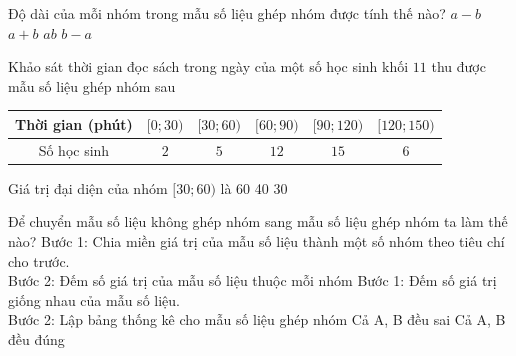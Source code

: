

\begin{ex}%
	Độ dài của mỗi nhóm trong mẫu số liệu ghép nhóm được tính  thế nào?
	\choice 
		 {$a-b$}
		 {$a+b$}
		{$ab$} 
		 {\True $b-a$}
	\loigiai{Độ dài của nhóm $[a;b)$ là  $b-a$.}
\end{ex}

\begin{ex}%
	Khảo sát thời gian đọc sách trong ngày của một số học sinh khối $11$  thu được mẫu số liệu ghép nhóm sau
	\begin{center}
		\begin{tabular}{|c|c|c|c|c|c|}
			 \hline
			Thời gian (phút) & $[0;30)$ & $[30;60)$ & $[60;90)$ & $[90;120)$ & $[120;150)$  \\
			\hline 
			Số học sinh & $2$ & $5$ & $12$ & $15$ & $6$ \\ 
			 \hline
		\end{tabular}
	\end{center}
	Giá  trị đại diện của nhóm $[30;60)$ là
	\choice 
		 {60}
		 {40}
		{}
		{30} 
	\loigiai{Giá trị đại diện của nhóm $[30;60)$ là $\dfrac{30+60}{2}=45$.} 
\end{ex}

\begin{ex}%
	Để chuyển mẫu số liệu không ghép nhóm sang mẫu số liệu ghép nhóm ta  làm thế nào?
	\choice 
		{\True Bước 1: Chia miền giá trị của mẫu số liệu thành một số nhóm theo tiêu  chí cho trước.
		\\ Bước 2: Đếm số giá trị của  mẫu số liệu thuộc mỗi nhóm}
		{Bước 1: Đếm số giá trị giống nhau của mẫu số liệu. \\ Bước 2: Lập bảng thống  kê cho mẫu số liệu ghép nhóm}
		{Cả  A, B đều sai}
		{Cả A,  B đều đúng}
\end{ex}

